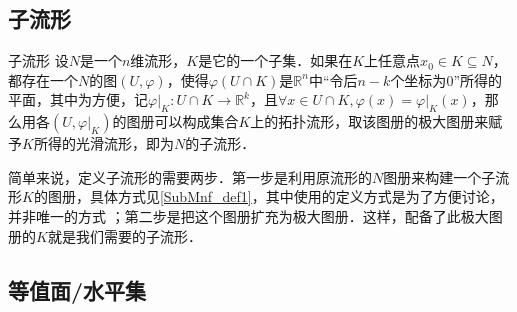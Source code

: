 

\subsection{子流形}

\begin{definition}{子流形}\label{SubMnf_def1}
设$N$是一个$n$维流形，$K$是它的一个子集．如果在$K$上任意点$x_0\in K\subseteq N$，都存在一个$N$的图$(U, \varphi)$，使得$\varphi (U\cap K)$是$\mathbb{R}^n$中“令后$n-k$个坐标为$0$”所得的平面，其中为方便，记$\varphi|_K:U\cap K\rightarrow\mathbb{R}^k$，且$\forall x\in U\cap K, \varphi(x)=\varphi|_K(x)$，那么用各$(U, \varphi|_K)$的图册可以构成集合$K$上的拓扑流形，取该图册的极大图册来赋予$K$所得的光滑流形，即为$N$的子流形．
\end{definition}

简单来说，定义子流形的需要两步．第一步是利用原流形的$N$图册来构建一个子流形$K$的图册，具体方式见\autoref{SubMnf_def1}，其中使用的定义方式是为了方便讨论，并非唯一的方式 ；第二步是把这个图册扩充为极大图册．这样，配备了此极大图册的$K$就是我们需要的子流形．


\subsection{等值面/水平集}%




